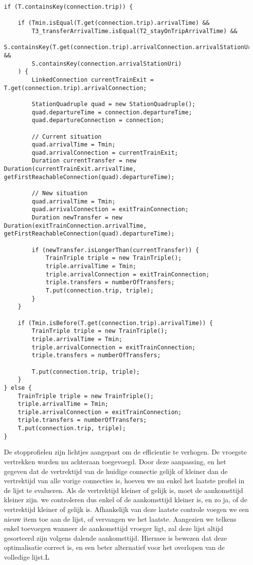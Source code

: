 \begin{code}
	\begin{verbatim}
if (T.containsKey(connection.trip)) {

	if (Tmin.isEqual(T.get(connection.trip).arrivalTime) && 
		T3_transferArrivalTime.isEqual(T2_stayOnTripArrivalTime) &&
		S.containsKey(T.get(connection.trip).arrivalConnection.arrivalStationUri) &&
		S.containsKey(connection.arrivalStationUri)
	) {
		LinkedConnection currentTrainExit = T.get(connection.trip).arrivalConnection;
		
		StationQuadruple quad = new StationQuadruple();
		quad.departureTime = connection.departureTime;
		quad.departureConnection = connection;
		
		// Current situation
		quad.arrivalTime = Tmin;
		quad.arrivalConnection = currentTrainExit;
		Duration currentTransfer = new Duration(currentTrainExit.arrivalTime, getFirstReachableConnection(quad).departureTime);
		
		// New situation
		quad.arrivalTime = Tmin;
		quad.arrivalConnection = exitTrainConnection;
		Duration newTransfer = new Duration(exitTrainConnection.arrivalTime, getFirstReachableConnection(quad).departureTime);

		if (newTransfer.isLongerThan(currentTransfer)) {
			TrainTriple triple = new TrainTriple();
			triple.arrivalTime = Tmin;
			triple.arrivalConnection = exitTrainConnection;
			triple.transfers = numberOfTransfers;
			T.put(connection.trip, triple);
		}
	}
	
	if (Tmin.isBefore(T.get(connection.trip).arrivalTime)) {
		TrainTriple triple = new TrainTriple();
		triple.arrivalTime = Tmin;
		triple.arrivalConnection = exitTrainConnection;
		triple.transfers = numberOfTransfers;
		
		T.put(connection.trip, triple);
	}
} else {
	TrainTriple triple = new TrainTriple();
	triple.arrivalTime = Tmin;
	triple.arrivalConnection = exitTrainConnection;
	triple.transfers = numberOfTransfers;
	T.put(connection.trip, triple);
}

\end{verbatim}
\end{code}

De stopprofielen zijn lichtjes aangepast om de efficientie te verhogen. De vroegste vertrekken worden nu achteraan toegevoegd. Door deze aanpassing, en het gegeven dat de vertrektijd van de huidige connectie gelijk of kleiner dan de vertrektijd van alle vorige connecties is, hoeven we nu enkel het laatste profiel in de lijst te evalueren. Als de vertrektijd kleiner of gelijk is, moet de aankomsttijd kleiner zijn. we controleren dus enkel of de aankomsttijd kleiner is, en zo ja, of de vertrektijd kleiner of gelijk is. Afhankelijk van deze laatste controle voegen we een nieuw item toe aan de lijst, of vervangen we het laatste. Aangezien we telkens enkel toevoegen wanneer de aankomsttijd vroeger ligt, zal deze lijst altijd gesorteerd zijn volgens dalende aankomsttijd. Hiermee is bewezen dat deze optimalisatie correct is, en een beter alternatief voor het overlopen van de volledige lijst.L


